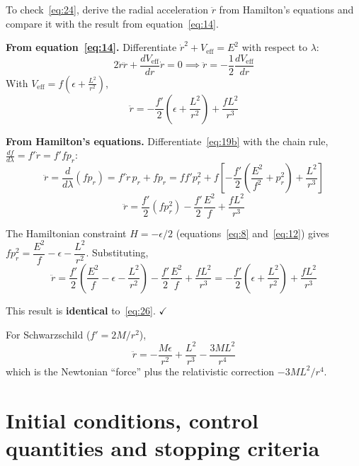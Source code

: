 \documentclass[11pt,a4paper]{article}
\newcommand{\Veff}{V_{\text{eff}}}
\begin{document}
To check~\eqref{eq:24}, derive the radial acceleration $\ddot{r}$ from Hamilton's equations and compare it with the result from equation~\eqref{eq:14}.

\textbf{From equation~\eqref{eq:14}.} Differentiate $\dot{r}^2 + \Veff = E^2$ with respect to $\lambda$:
\begin{equation*}
2\dot{r}\ddot{r} + \frac{d\Veff}{dr}\dot{r} = 0 \implies \ddot{r} = -\frac{1}{2}\frac{d\Veff}{dr}
\end{equation*}
With $\Veff = f\left(\epsilon + \frac{L^2}{r^2}\right)$,
\begin{equation*}
\ddot{r} = -\frac{f'}{2}\left(\epsilon + \frac{L^2}{r^2}\right) + \frac{f L^2}{r^3} \tag{26}\label{eq:26}
\end{equation*}

\textbf{From Hamilton's equations.} Differentiate~\eqref{eq:19b} with the chain rule, $\frac{d f}{d\lambda} = f'\dot{r} = f' f p_r$:
\begin{equation*}
\ddot{r} = \frac{d}{d\lambda}\left( f p_r \right) = f' \dot{r}\, p_r + f \dot{p}_r = f f' p_r^2 + f \left[ -\frac{f'}{2}\left( \frac{E^2}{f^2} + p_r^2 \right) + \frac{L^2}{r^3} \right]
\end{equation*}
\begin{equation*}
\ddot{r} = \frac{f'}{2}\left( f p_r^2 \right) - \frac{f'}{2}\frac{E^2}{f} + \frac{f L^2}{r^3}
\end{equation*}

The Hamiltonian constraint $H = -\epsilon/2$ (equations~\eqref{eq:8} and~\eqref{eq:12}) gives $f p_r^2 = \dfrac{E^2}{f} - \epsilon - \dfrac{L^2}{r^2}$. Substituting,
\begin{equation*}
\ddot{r} = \frac{f'}{2}\left( \frac{E^2}{f} - \epsilon - \frac{L^2}{r^2} \right) - \frac{f'}{2}\frac{E^2}{f} + \frac{f L^2}{r^3}
= -\frac{f'}{2}\left(\epsilon + \frac{L^2}{r^2}\right) + \frac{f L^2}{r^3}
\end{equation*}

This result is \textbf{identical} to~\eqref{eq:26}. $\checkmark$

For Schwarzschild ($f' = 2M/r^2$),
\begin{equation*}
\ddot{r} = -\frac{M\epsilon}{r^2} + \frac{L^2}{r^3} - \frac{3ML^2}{r^4} \tag{27}\label{eq:27}
\end{equation*}
which is the Newtonian ``force'' plus the relativistic correction $-3ML^2/r^4$.

\section{Initial conditions, control quantities and stopping criteria}
\label{sec:initial}
\end{document}
